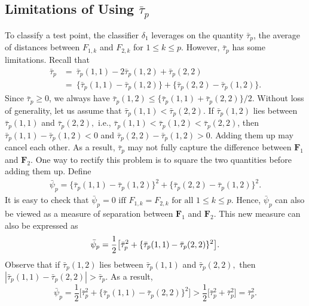 \documentclass[twoside]{article}
\newcommand{\bF}{\mathbf{F}}
\newcommand{\0}{\mathbf{0}}
\newcommand{\1}{\mathbf{1}}
\numberwithin{equation}{section}
\begin{document}
\subsection{Limitations of Using $\bar{\tau}_p$}\label{method.taubarlim}
To classify a test point, the classifier $\delta_1$ leverages on the quantity $\bar{\tau}_p$, the average of distances between $F_{1,k}$ and $F_{2,k}$ for $1\le k\le p.$ However, $\bar{\tau}_p$ has some limitations. Recall that
\begin{align*}
 \bar{\tau}_p& =\ \bar{\tau}_p(1,1) - 2\bar{\tau}_p(1,2) + \bar{\tau}_p(2,2)\\
 &=\ \{\bar{\tau}_p(1,1) - \bar{\tau}_p(1,2)\}+\{\bar{\tau}_p(2,2) - \bar{\tau}_p(1,2)\}.
\end{align*}
Since $\bar{\tau}_p\geq 0$, we always have $\bar{\tau}_p(1,2)\leq \{\bar{\tau}_p(1,1) + \bar{\tau}_p(2,2)\}/2$. Without loss of generality, let us assume that $\bar{\tau}_p(1,1)< \bar{\tau}_p(2,2)$. If $\bar{\tau}_p(1,2)$ lies between $\bar{\tau}_p(1,1)$ and $\bar{\tau}_p(2,2),$ i.e., $\bar{\tau}_p(1,1) < \bar{\tau}_p(1,2)<\bar{\tau}_p(2,2) $, then $\bar{\tau}_p(1,1) - \bar{\tau}_p(1,2)<0$ and $\bar{\tau}_p(2,2) - \bar{\tau}_p(1,2)>0.$ Adding them up may cancel each other. As a result, $\bar{\tau}_p$ may not fully capture the difference between $\bF_1$ and $\bF_2.$ %
One way to rectify this problem is to square the two quantities before adding them up. %
Define
\begin{align*}%
 \bar{\psi}_p = \{\bar{\tau}_p(1,1) - \bar{\tau}_p(1,2)\}^2+\{\bar{\tau}_p(2,2) - \bar{\tau}_p(1,2)\}^2.
\end{align*}
It is easy to check that
$\bar{\psi}_p=0\text{ iff }F_{1,k}=F_{2,k}\text{ for all }1\le k\le p.$ Hence, $\bar{\psi}_p$ can also be viewed as a measure of separation between $\bF_1$ and $\bF_2.$ This new measure can also be expressed as
\begin{align}\label{psibardef}
 \bar{\psi}_p=\frac{1}{2}\big [\bar{\tau}_p^2 +\{\bar{\tau}_p(1,1) - \bar{\tau}_p(2,2)\}^2\big ].\vspace{-0.175cm}
\end{align}
Observe that if $\bar{\tau}_p(1,2)$ lies between $\bar{\tau}_p(1,1)$ and $\bar{\tau}_p(2,2),$ then $|\bar{\tau}_p(1,1)-\bar{\tau}_p(2,2)|> \bar{\tau}_p.$ As a result,
$$\bar{\psi}_p=\frac{1}{2}\big [\bar{\tau}_p^2 +\{\bar{\tau}_p(1,1) - \bar{\tau}_p(2,2)\}^2\big ]> \frac{1}{2}\big [\bar{\tau}_p^2 +\bar{\tau}_p^2]=\bar{\tau}_p^2.$$
\end{document}

